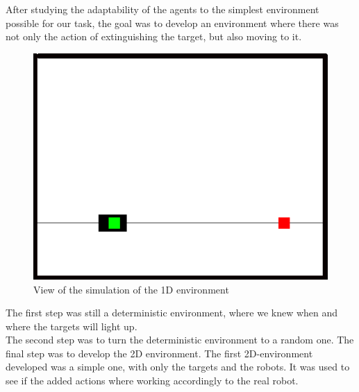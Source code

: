 \documentclass[conference]{IEEEtran}
\begin{document}
After studying the adaptability of the agents to the simplest environment possible for our task, the goal was to develop an environment where there was not only the action of extinguishing the target, but also moving to it.\\

\begin{figure}
  \includegraphics[scale = 0.4]{images/1Dsimple.png}
  \caption{View of the simulation of the 1D environment}
  \label{fig:my-figure}
\end{figure}

The first step was still a deterministic environment, where we knew when and where the targets will light up.\\
The second step was to turn the deterministic environment to a random one.
The final step was to develop the 2D environment. The first 2D-environment developed was a simple one, with only the targets and the robots. It was used to see if the added actions where working accordingly to the real robot.\\
\end{document}
